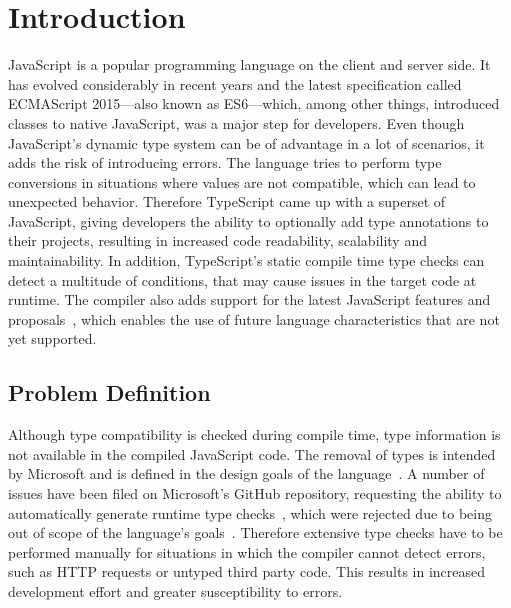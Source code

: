 \chapter{Introduction}
\label{cha:introduction}

JavaScript is a popular programming language on the client and server side. It has evolved considerably in recent years and the latest specification called ECMAScript 2015---also known as ES6---which, among other things, introduced classes to native JavaScript, was a major step for developers. Even though JavaScript's dynamic type system can be of advantage in a lot of scenarios, it adds the risk of introducing errors. The language tries to perform type conversions in situations where values are not compatible, which can lead to unexpected behavior. Therefore TypeScript came up with a superset of JavaScript, giving developers the ability to optionally add type annotations to their projects, resulting in increased code readability, scalability and maintainability. In addition, TypeScript's static compile time type checks can detect a multitude of conditions, that may cause issues in the target code at runtime. The compiler also adds support for the latest JavaScript features and proposals~\cites{TypeScriptHandbook:CompilerOptions, TypeScriptWebsite}, which enables the use of future language characteristics that are not yet supported.

\section{Problem Definition}
\label{sec:problem-definition}

Although type compatibility is checked during compile time, type information is not available in the compiled JavaScript code. The removal of types is intended by Microsoft and is defined in the design goals of the language~\cite{TypeScriptWiki:DesignGoals}. A number of issues have been filed on Microsoft's GitHub repository, requesting the ability to automatically generate runtime type checks~\cites{TypeScriptIssue:RuntimeTypeChecking, TypeScriptIssue:RuntimeTypeChecks, TypeScriptIssue:EmitTypeArguments}, which were rejected due to being out of scope of the language's goals~\cites{TypeScriptIssue:RuntimeTypeChecking:Comment:OutOfScope, TypeScriptIssue:EmitTypeArguments:Comment:OutOfScope}. Therefore extensive type checks have to be performed manually for situations in which the compiler cannot detect errors, such as HTTP requests or untyped third party code. This results in increased development effort and greater susceptibility to errors.

